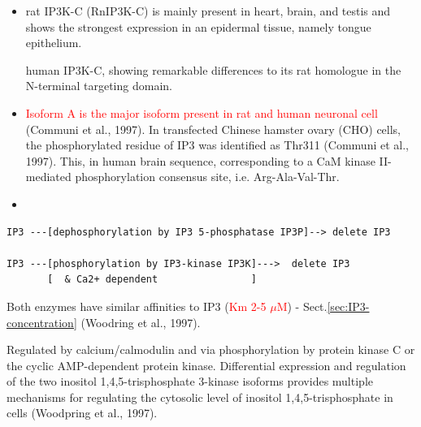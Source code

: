 \begin{itemize}
  \item  rat IP3K-C (RnIP3K-C) is mainly present in heart, brain, and testis and
  shows the strongest expression in an epidermal tissue, namely tongue epithelium. 
 
 human IP3K-C, showing remarkable differences to its rat homologue in the
 N-terminal targeting domain.
  
  \item \textcolor{red}{Isoform A is the major isoform present in rat and human
  neuronal cell} (Communi et al., 1997). In transfected Chinese hamster ovary
  (CHO) cells, the phosphorylated residue of IP3 was identified as Thr311
  (Communi et al., 1997). This, in human brain sequence, corresponding to a CaM
  kinase II-mediated phosphorylation consensus site, i.e. Arg-Ala-Val-Thr.

  \item
\end{itemize}

\begin{verbatim}
IP3 ---[dephosphorylation by IP3 5-phosphatase IP3P]--> delete IP3 
	
IP3 ---[phosphorylation by IP3-kinase IP3K]--->  delete IP3
       [  & Ca2+ dependent                ]  
\end{verbatim}

Both enzymes have similar affinities to IP3 (\textcolor{red}{Km 2-5 $\mu$M}) -
Sect.\ref{sec:IP3-concentration} (Woodring et al., 1997).

Regulated by calcium/calmodulin and via phosphorylation by protein kinase C or
the cyclic AMP-dependent protein kinase. Differential expression and regulation
of the two inositol 1,4,5-trisphosphate 3-kinase isoforms provides multiple
mechanisms for regulating the cytosolic level of inositol 1,4,5-trisphosphate in
cells (Woodpring et al., 1997).

